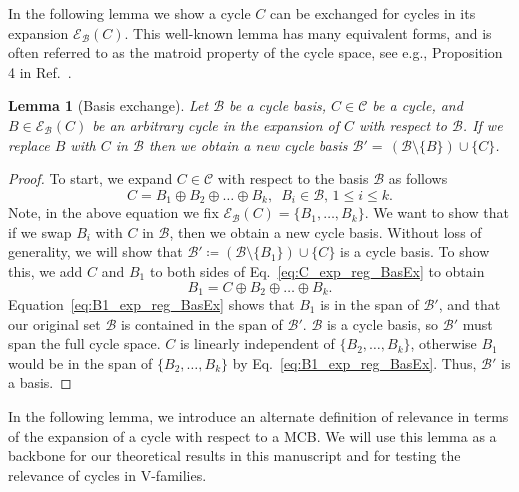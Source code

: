 \documentclass[fleqn,11pt]{article}
\newtheorem{lemma}[theorem]{Lemma}
\newcommand\calB{\mathcal{B}}
\newcommand\CycSp{\mathcal{C}}    %
\newcommand\expand[2]{\mathcal{E}_{#1}\left(#2\right)}   %
\begin{document}
	In the following lemma we show a cycle $C$ can be exchanged for cycles in its expansion $\expand{\calB}{C}$. {This well-known lemma has many equivalent forms, and is often referred to as the matroid property of the cycle space, see e.g., Proposition 4 in Ref.~\cite{gleissInterchangeability2000}.}

\begin{lemma}[Basis exchange]
	Let $\calB$ be a cycle basis, $C\in\CycSp$ be a cycle, and $B\in\expand{\calB}{C}$ be an arbitrary cycle in the expansion of $C$ with respect to $\calB$. If we replace $B$ with $C$ in $\calB$ then we obtain a new cycle basis $\calB' {=}\, (\calB{\setminus} \{B\}){\cup}\{C\}$.\nolinebreak %
	\label{Lem:Bas_Ex}
\end{lemma}
\begin{proof}
	To start, we expand $C\in\CycSp$ with respect to the basis $\calB$ as follows
	\begin{equation}
		C = B_1{\oplus} B_2 {\oplus}\hdots {\oplus} B_k, \enspace B_i{\in}\calB\text{, }1{\le} i{\le} k.\label{eq:C_exp_reg_BasEx}
	\end{equation}
	Note, in the above equation we fix $\expand{\calB}{C}=\{B_1,\hdots,B_k\}$. We want to show that if we swap $B_i$ with $C$ in $\calB$, then we obtain a new cycle basis. Without loss of generality, we will show that $\calB'\coloneq (\calB\setminus\{B_1\})\cup\{C\}$ is a cycle basis.
	To show this, we add $C$ and $B_1$ to both sides of Eq.~\eqref{eq:C_exp_reg_BasEx} to obtain
	\begin{equation}
		B_1 = C\oplus B_2\oplus\hdots\oplus B_k.\label{eq:B1_exp_reg_BasEx}
	\end{equation}
	Equation~\eqref{eq:B1_exp_reg_BasEx} shows that $B_1$ is in the span of $\calB'$, and that our original set $\calB$ is contained in the span of $\calB'$. $\calB$ is a cycle basis, so $\calB'$ must span the full cycle space. $C$ is linearly independent of $\{B_2,\hdots,B_k\}$, otherwise $B_1$ would be in the span of $\{B_2,\hdots,B_k\}$ by Eq.~\eqref{eq:B1_exp_reg_BasEx}. Thus, $\calB'$ is a basis.
\end{proof}

	
	{In the following lemma, we introduce an alternate definition of relevance in terms of the expansion of a cycle with respect to a MCB. We will use this lemma as a backbone for our theoretical results in this manuscript and for testing the relevance of cycles in V-families.
	}%
\end{document}
